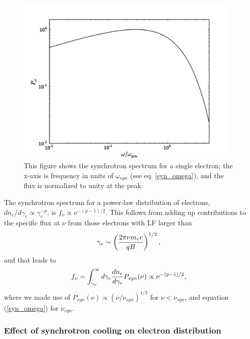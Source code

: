 \documentclass[12pt,a4paper]{article}
\begin{document}
\begin{figure}
\begin{center}
\includegraphics[width=11cm]{synchro_spec1.jpg}
\caption{This figure shows the synchrotron spectrum for a single
electron; the x-axis is frequency in units of $\omega_{syn}$ (see
eq. \ref{syn_omega}), and the flux is normalized to unity at the peak.
}\label{FIG:syn_spec}
\end{center}
\end{figure}

The synchrotron spectrum for a power-law distribution of electrons, 
$d n_e/d\gamma_e \propto \gamma_e^{-p}$, is $f_\nu\propto\nu^{-(p-1)/2}$.
This follows from adding up contributions to the specific flux at $\nu$
from those electrons with LF larger than
\begin{equation}
   \gamma_\nu \sim \left( {2\pi\nu m_e c \over q B}\right)^{1/2},
  \label{gamma_nu}
\end{equation}
and that leads to
\begin{equation}
   f_\nu = \int_{\gamma_\nu}^\infty d\gamma_e {d n_e\over d\gamma_e}
        P_{syn}(\nu) \propto \nu^{-(p-1)/2},
\end{equation}
where we made use of $P_{syn}(\nu) \propto (\nu/\nu_{syn})^{1/3}$ for
$\nu < \nu_{syn}$, and equation (\ref{syn_omega}) for $\nu_{syn}$.

\subsubsection{Effect of synchrotron cooling on electron distribution}
\end{document}
